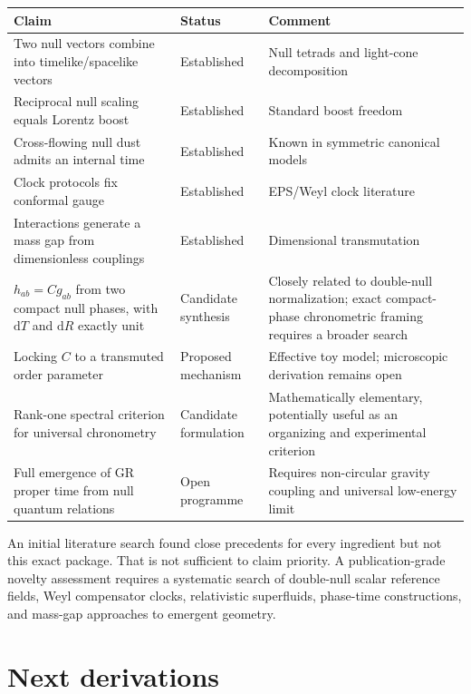 \documentclass[11pt,a4paper]{article}
\newcommand{\dd}{\mathrm{d}}
\newcommand{\Ccross}{C}
\begin{document}
\begin{center}
\begin{tabular}{>{\raggedright\arraybackslash}p{} >{\raggedright\arraybackslash}p{} >{\raggedright\arraybackslash}p{}}
\toprule
Claim & Status & Comment \\
\midrule
Two null vectors combine into timelike/spacelike vectors & Established & Null tetrads and light-cone decomposition \\
Reciprocal null scaling equals Lorentz boost & Established & Standard boost freedom \\
Cross-flowing null dust admits an internal time & Established & Known in symmetric canonical models \\
Clock protocols fix conformal gauge & Established & EPS/Weyl clock literature \\
Interactions generate a mass gap from dimensionless couplings & Established & Dimensional transmutation \\
$h_{ab}=\Ccross g_{ab}$ from two compact null phases, with $\dd T$ and $\dd R$ exactly unit & Candidate synthesis & Closely related to double-null normalization; exact compact-phase chronometric framing requires a broader search \\
Locking $\Ccross$ to a transmuted order parameter & Proposed mechanism & Effective toy model; microscopic derivation remains open \\
Rank-one spectral criterion for universal chronometry & Candidate formulation & Mathematically elementary, potentially useful as an organizing and experimental criterion \\
Full emergence of GR proper time from null quantum relations & Open programme & Requires non-circular gravity coupling and universal low-energy limit \\
\bottomrule
\end{tabular}
\end{center}

An initial literature search found close precedents for every ingredient but not this exact package. That is not sufficient to claim priority. A publication-grade novelty assessment requires a systematic search of double-null scalar reference fields, Weyl compensator clocks, relativistic superfluids, phase-time constructions, and mass-gap approaches to emergent geometry.

\section{Next derivations}
\end{document}
